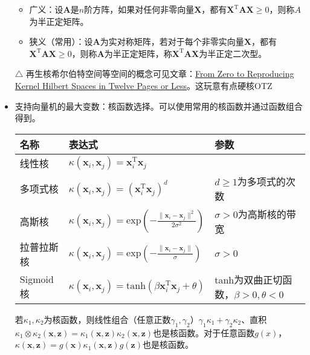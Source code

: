 \documentclass{ctexart}
\begin{document}
\begin{itemize}
\begin{framed}
\begin{itemize}
								\item 广义：设$\bm{A}$是$n$阶方阵，如果对任何非零向量$\bm{X}$，都有$\bm{X}^{\mathrm{T}}\bm{A}\bm{X}\ge0$，则称$A$为半正定矩阵。
								\item 狭义（常用）：设$\bm{A}$为实对称矩阵，若对于每个非零实向量$\bm{X}$，都有$\bm{X}^{\mathrm{T}}\bm{A}\bm{X}\ge0$，则称$\bm{A}$为半正定矩阵，称$\bm{X}^{\mathrm{T}}\bm{AX}$为半正定二次型。
							\end{itemize}
							$\triangle$ 再生核希尔伯特空间等空间的概念可见文章：\href{http://users.umiacs.umd.edu/~hal/docs/daume04rkhs.pdf}{From Zero to Reproducing Kernel Hilbert Spaces in Twelve Pages or Less}。这玩意有点硬核OTZ
						\end{framed}
						\item 支持向量机的最大变数：核函数选择。可以使用常用的核函数并通过函数组合得到。\begin{center}
							\begin{tabular}{lll}
								\hline
								名称 & 表达式 & 参数\\ \hline
								线性核 & $\kappa(\bm{x}_i,\bm{x}_j)=\bm{x}_i^{\mathrm{T}}\bm{x}_j$ & \\
								多项式核 & $\kappa(\bm{x}_i,\bm{x}_j)=(\bm{x}_i^{\mathrm{T}}\bm{x}_j)^d$ & $d\ge1$为多项式的次数 \\
								高斯核 & $\kappa(\bm{x}_i,\bm{x}_j)=\mathrm{exp}(-\frac{\parallel \bm{x}_i-\bm{x}_j\parallel^2}{2\sigma^2})$ & $\sigma>0$为高斯核的带宽 \\
								拉普拉斯核 & $\kappa(\bm{x}_i,\bm{x}_j)=\mathrm{exp}(-\frac{\parallel\bm{x}_i-\bm{x}_j\parallel}{\sigma})$ & $\sigma>0$ \\
								Sigmoid核 & $\kappa(\bm{x}_i,\bm{x}_j)=\mathrm{tanh}(\beta\bm{x}_i^{\mathrm{T}}\bm{x}_j+\theta)$ & tanh为双曲正切函数，$\beta>0,\theta<0$ \\ \hline
							\end{tabular}
						\end{center}
						若$\kappa_1,\kappa_2$为核函数，则线性组合（任意正数$\gamma_1,\gamma_2$）$\gamma_1\kappa_1+\gamma_2\kappa_2$、直积$\kappa_1\otimes\kappa_2(\bm{x},\bm{z})=\kappa_1(\bm{x},\bm{z})\kappa_2(\bm{x},\bm{z})$也是核函数。对于任意函数$g(x)$，$\kappa(\bm{x},\bm{z})=g(\bm{x})\kappa_1(\bm{x},\bm{z})g(\bm{z})$也是核函数。
					\end{itemize}
\end{document}
